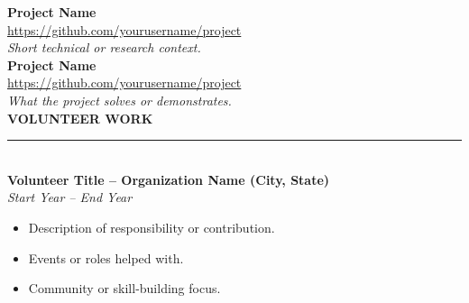 \documentclass[10pt,A4]{article}
\newcommand{\cvsection}[1] {
	\vspace{14pt}
	\textbf{\LARGE{\textcolor{darkcol}{\uppercase{#1}}}}\\[-4pt]
	\textcolor{maincol}{ \rule{0.1\textwidth}{2pt} } \\
}
\newcommand{\cvproject}[3]{
  \vspace{4pt}
  \textbf{{#1}} \\
  {\footnotesize\href{#2}{#2}} \\
  \textit{#3} \\
}
\begin{document}
\begin{paracol}{2}
\begin{rightcolumn}
\cvproject
  {Project Name}
  {https://github.com/yourusername/project}
  {Short technical or research context.}

\cvproject
  {Project Name}
  {https://github.com/yourusername/project}
  {What the project solves or demonstrates.}

\cvsection{Volunteer Work}

\textbf{Volunteer Title – Organization Name (City, State)} \\
\textit{Start Year – End Year} \\
\begin{itemize}
  \item Description of responsibility or contribution.
  \item Events or roles helped with.
  \item Community or skill-building focus.
\end{itemize}

\end{rightcolumn}
\end{paracol}
\end{document}
